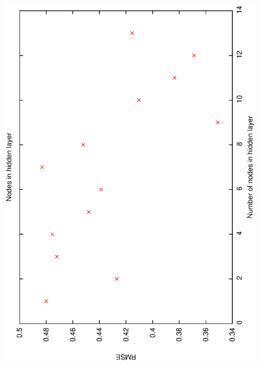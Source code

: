 \documentclass[12pt,a4,notitlepage]{report}
\renewcommand{\_}{\texttt{\symbol{95}}}
\newcommand{\<}{\texttt{\symbol{60}}}
\renewcommand{\>}{\texttt{\symbol{62}}}
\begin{document}
\begin{figure}
\includegraphics[scale=0.3,angle=-90]{results/neural_err/n_hidden_nodes.ps}

\end{figure}
\end{document}
